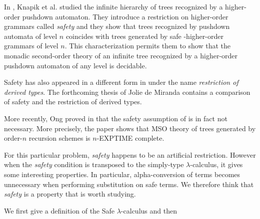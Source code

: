 
In \cite{KNU02}, Knapik et al. studied the infinite hierarchy of
trees recognized by a higher-order pushdown automaton. They
introduce a restriction on higher-order grammars called
\emph{safety} and they show that trees recognized by pushdown
automata of level $n$ coincides with trees generated by safe
-higher-order grammars of level $n$. This characterization permits
them to show that the monadic second-order theory of an infinite
tree recognized by a higher-order pushdown automaton of any level is
decidable.

Safety has also appeared in a different form in \cite{Dam82} under
the name \emph{restriction of derived types}. The forthcoming thesis
of Jolie de Miranda \citep{demirandathesis} contains a comparison of
safety and the restriction of derived types.

More recently, Ong proved in \cite{OngLics2006} that the safety
assumption of \cite{KNU02} is in fact not necessary. More precisely,
the paper shows that MSO theory of trees generated by order-$n$
recursion schemes is $n$-EXPTIME complete.

For this particular problem, \emph{safety} happens to be an
artificial restriction. However when the \emph{safety} condition is
transposed to the simply-type $\lambda$-calculus, it gives some
interesting properties. In particular, alpha-conversion of terms
becomes unnecessary when performing substitution on safe terms. We
therefore think that \emph{safety} is a property that is worth
studying.

We first give a definition of the Safe $\lambda$-calculus and then
